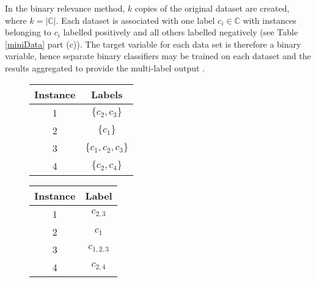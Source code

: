 \documentclass[Dissertation.tex]{subfiles}
\begin{document}
In the binary relevance method, $ k $ copies of the original dataset are created, where $ k = |\mathbb{C}| $. Each dataset is associated with one label $c_i \in \mathbb{C}$ with instances belonging to $ c_i $ labelled positively and all others labelled negatively (see Table \ref{miniData} part (c)). The target variable for each data set is therefore a binary variable, hence separate binary classifiers may be trained on each dataset and the results aggregated to provide the multi-label output \cite{sorowerLiteratureSurveyAlgorithms2018}.	

 
		
\begin{table}[]
	\centering

	\caption{Sample dataset in multi-label and label power set formats}
	\label{miniData}
	\begin{subfigure}{0.25\linewidth}
		\centering
		\begin{tabular*}{1\linewidth}{@{}cc@{}}
	
			\toprule
			Instance & Labels \\ \midrule
			1	&	$ \{c_2,c_3\} $        \\
			2	&	$ \{c_1\} $        \\
			3	&	$ \{c_1,c_2,c_3\} $        \\
			4	&	$ \{c_2, c_4\} $        \\ \bottomrule
		\end{tabular*}
	\end{subfigure}
	\qquad
	\begin{subfigure}{0.25\linewidth}
		\centering
		\begin{tabular*}{1\linewidth}{@{}cc@{}}
			
			\toprule
			Instance & Label \\ \midrule
			1	&	$ c_{2,3} $        \\
			2	&	$ c_1$        \\
			3	&	$ c_{1,2,3} $        \\
			4	&	$ c_{2,4} $        \\ \bottomrule
		\end{tabular*}
	\end{subfigure}

\vspace{3ex}


\end{table}
\end{document}
